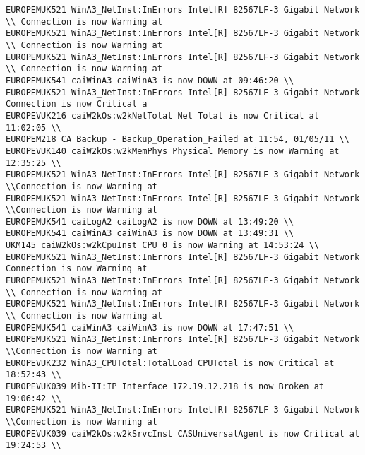 \begin{lstlisting}
EUROPEMUK521 WinA3_NetInst:InErrors Intel[R] 82567LF-3 Gigabit Network \\ Connection is now Warning at
EUROPEMUK521 WinA3_NetInst:InErrors Intel[R] 82567LF-3 Gigabit Network \\ Connection is now Warning at
EUROPEMUK521 WinA3_NetInst:InErrors Intel[R] 82567LF-3 Gigabit Network \\ Connection is now Warning at
EUROPEMUK541 caiWinA3 caiWinA3 is now DOWN at 09:46:20 \\
EUROPEMUK521 WinA3_NetInst:InErrors Intel[R] 82567LF-3 Gigabit Network Connection is now Critical a
EUROPEVUK216 caiW2kOs:w2kNetTotal Net Total is now Critical at 11:02:05 \\
EUROPEM218 CA Backup - Backup_Operation_Failed at 11:54, 01/05/11 \\
EUROPEVUK140 caiW2kOs:w2kMemPhys Physical Memory is now Warning at 12:35:25 \\
EUROPEMUK521 WinA3_NetInst:InErrors Intel[R] 82567LF-3 Gigabit Network  \\Connection is now Warning at
EUROPEMUK521 WinA3_NetInst:InErrors Intel[R] 82567LF-3 Gigabit Network \\Connection is now Warning at
EUROPEMUK541 caiLogA2 caiLogA2 is now DOWN at 13:49:20 \\
EUROPEMUK541 caiWinA3 caiWinA3 is now DOWN at 13:49:31 \\
UKM145 caiW2kOs:w2kCpuInst CPU 0 is now Warning at 14:53:24 \\
EUROPEMUK521 WinA3_NetInst:InErrors Intel[R] 82567LF-3 Gigabit Network Connection is now Warning at
EUROPEMUK521 WinA3_NetInst:InErrors Intel[R] 82567LF-3 Gigabit Network \\ Connection is now Warning at
EUROPEMUK521 WinA3_NetInst:InErrors Intel[R] 82567LF-3 Gigabit Network \\ Connection is now Warning at
EUROPEMUK541 caiWinA3 caiWinA3 is now DOWN at 17:47:51 \\
EUROPEMUK521 WinA3_NetInst:InErrors Intel[R] 82567LF-3 Gigabit Network \\Connection is now Warning at
EUROPEVUK232 WinA3_CPUTotal:TotalLoad CPUTotal is now Critical at 18:52:43 \\
EUROPEVUK039 Mib-II:IP_Interface 172.19.12.218 is now Broken at 19:06:42 \\
EUROPEMUK521 WinA3_NetInst:InErrors Intel[R] 82567LF-3 Gigabit Network \\Connection is now Warning at
EUROPEVUK039 caiW2kOs:w2kSrvcInst CASUniversalAgent is now Critical at 19:24:53 \\

\end{lstlisting}
